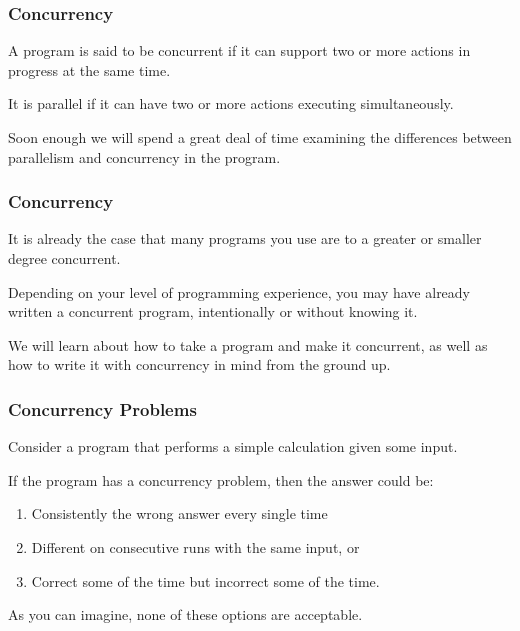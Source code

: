 \begin{frame}
\frametitle{Concurrency}
A program is said to be concurrent if it can support two or more actions in progress at the same time. 

It is parallel if it can have two or more actions executing simultaneously.

Soon enough we will spend a great deal of time examining the differences between parallelism and concurrency in the program.

\end{frame}

\begin{frame}
\frametitle{Concurrency}

It is already the case that many programs you use are to a greater or smaller degree concurrent. 

Depending on your level of programming experience, you may have already written a concurrent program, intentionally or without knowing it. 

We will learn about how to take a program and make it concurrent, as well as how to write it with concurrency in mind from the ground up.

\end{frame}


\begin{frame}
\frametitle{Concurrency Problems}

Consider a program that performs a simple calculation given some input. 

If the program has a concurrency problem,  then the answer could be:

\begin{enumerate} 
\item Consistently the wrong answer every single time
\item Different on consecutive runs with the same input, or 
\item Correct some of the time but incorrect some of the time. 
\end{enumerate}

As you can imagine, none of these options are acceptable.

\end{frame}



